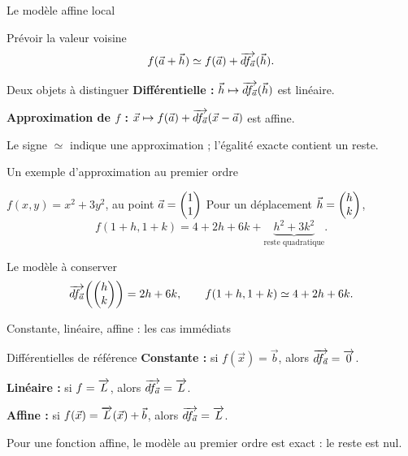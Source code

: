 \begin{frame}[t]{Le modèle affine local}
\coursanalyse
\begin{resultat}{Prévoir la valeur voisine}
\[f(\vec a+\vec h)\simeq f(\vec a)+\overrightarrow{df_{\vec a}}(\vec h).\]
\end{resultat}
\begin{cours}{Deux objets à distinguer}
\textbf{Différentielle :} $\vec h\mapsto\overrightarrow{df_{\vec a}}(\vec h)$ est linéaire.

\medskip
\textbf{Approximation de $f$ :} $\vec x\mapsto f(\vec a)+\overrightarrow{df_{\vec a}}(\vec x-\vec a)$ est affine.
\end{cours}
\vfill Le signe $\simeq$ indique une approximation ; l'égalité exacte contient un reste.
\end{frame}

\begin{frame}[t]{Un exemple d’approximation au premier ordre}
\coursanalyse
\begin{exemple}{$f(x,y)=x^2+3y^2$, au point $\vec a=\begin{pmatrix}1\\1\end{pmatrix}$}
Pour un déplacement $\vec h=\begin{pmatrix}h\\k\end{pmatrix}$,
\[f(1+h,1+k)=4+2h+6k+\underbrace{h^2+3k^2}_{\text{reste quadratique}}.\]
\end{exemple}
\begin{resultat}{Le modèle à conserver}
\[\overrightarrow{df_{\vec a}}\!\left(\begin{pmatrix}h\\k\end{pmatrix}\right)=2h+6k,\qquad f(1+h,1+k)\simeq4+2h+6k.\]
\end{resultat}
\end{frame}

\begin{frame}[t]{Constante, linéaire, affine : les cas immédiats}
\coursanalyse
\begin{theoreme}{Différentielles de référence}
\textbf{Constante :} si $f(\vec x)=\vec b$, alors $\overrightarrow{df_{\vec a}}=\overrightarrow{0}$.

\medskip
\textbf{Linéaire :} si $f=\overrightarrow{L}$, alors $\overrightarrow{df_{\vec a}}=\overrightarrow{L}$.

\medskip
\textbf{Affine :} si $f(\vec x)=\overrightarrow{L}(\vec x)+\vec b$, alors $\overrightarrow{df_{\vec a}}=\overrightarrow{L}$.
\end{theoreme}
\vfill Pour une fonction affine, le modèle au premier ordre est exact : le reste est nul.
\end{frame}

